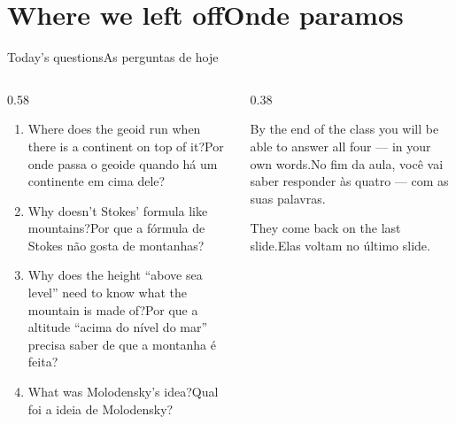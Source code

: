 \documentclass[aspectratio=169,11pt]{beamer}
\newcommand{\tr}[2]{\ifEN#2\else#1\fi}
\begin{document}
\section{\tr{Onde paramos}{Where we left off}}

\begin{frame}{\tr{As perguntas de hoje}{Today's questions}}
  \begin{columns}[T]
    \begin{column}{0.58\textwidth}
      \begin{enumerate}
        \setlength{\itemsep}{8pt}
        \item \tr{Por onde passa o geoide quando há um continente em cima dele?}{Where does
              the geoid run when there is a continent on top of it?}
        \item \tr{Por que a fórmula de Stokes não gosta de montanhas?}{Why doesn't Stokes'
              formula like mountains?}
        \item \tr{Por que a altitude ``acima do nível do mar'' precisa saber de que a montanha
              é feita?}{Why does the height ``above sea level'' need to know what the
              mountain is made of?}
        \item \tr{Qual foi a ideia de Molodensky?}{What was Molodensky's idea?}
      \end{enumerate}
    \end{column}
    \begin{column}{0.38\textwidth}
      \begin{ideia}[title={\tr{Combinado}{Deal}}]
        \tr{No fim da aula, você vai saber responder às quatro --- com as suas palavras.}{By
        the end of the class you will be able to answer all four --- in your own words.}
        \medskip

        \tr{Elas voltam no último slide.}{They come back on the last slide.}
      \end{ideia}
    \end{column}
  \end{columns}
\end{frame}
\end{document}
